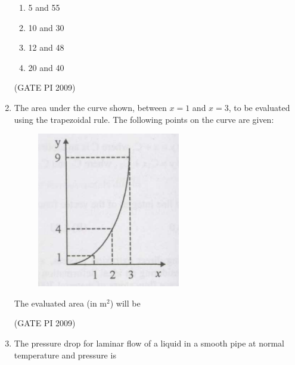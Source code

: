 \documentclass[journal,12pt,onecolumn]{IEEEtran}
\theoremstyle{remark}
\begin{document}
\begin{enumerate}[label=Q.\arabic*]
\begin{enumerate}[label=(\Alph*)]
\item 5 and 55
\item 10 and 30 
\item 12 and 48
\item 20 and 40
\end{enumerate}
\hfill (GATE PI 2009)
\item The area under the curve shown, between $x=1$ and $x=3$, to be evaluated using the trapezoidal rule. The following points on the curve are given:
\begin{figure}[h]
    \centering
    \includegraphics[width=0.3\linewidth]{figs/3.png}
    \label{fig:placeholder}
\end{figure} 
\begin{center}

\end{center}
The evaluated area (in m$^2$) will be
\begin{enumerate}[label=(\Alph*)]
\end{enumerate}
\hfill (GATE PI 2009)
\item The pressure drop for laminar flow of a liquid in a smooth pipe at normal temperature and pressure is
\begin{enumerate}[label=(\Alph*)]
\end{enumerate}
\end{enumerate}
\end{document}
